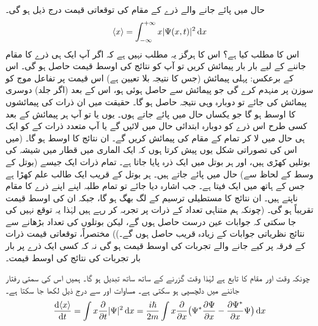  حال  میں پائے جانے والے ذرے کے مقام  کی توقعاتی قیمت درج ذیل ہو گی۔
\begin{align}\label{مساوات_تفاعل_موج_معیار_حرکت_توقعاتی_قیمت_تعریف}
\langle x\rangle=\int_{-\infty}^{+\infty}x|\Psi (x,t)|^{2}\dif{x}
\end{align}
اس کا مطلب کیا ہے؟ اس کا ہرگز یہ مطلب نہیں ہے کہ اگر آپ ایک ہی ذرے کا مقام جاننے کے لیے بار بار پیمائش کریں تو آپ کو نتائج کی اوسط قیمت  حاصل ہو گی۔ اس کے برعکس: پہلی پیمائش (جس کا نتیجہ بلا تعیین ہے) اس قیمت پر تفاعل موج کو سوزن پر منہدم کرے گی جو پیمائش سے حاصل ہوئی ہو، اس کے بعد (اگر جلد) دوسری پیمائش کی جائے تو دوبارہ وہی نتیجہ حاصل ہو گا۔ حقیقت میں 
 ان ذرات کی پیمائشوں کا اوسط ہو گا جو یکساں حال  میں پائے جاتے ہوں۔ یوں یا تو آپ ہر پیمائش کے بعد کسی طرح اس ذرے کو دوبارہ ابتدائی حال  میں لائیں گے یا آپ متعدد ذرات کے  کو ایک ہی حال  میں لا کر تمام کے مقام کی پیمائش کریں گے۔ ان نتائج کا اوسط  ہو گا۔ (میں اس کی تصوراتی شکل یوں پیش کرتا ہوں کہ ایک الماری میں قطار میں شیشہ کی بوتلیں کھڑی ہیں، اور ہر بوتل میں ایک ذرہ پایا جاتا ہے۔ تمام ذرات ایک جیسے (بوتل کے وسط کے لحاظ سے) حال  میں پائے جاتے ہیں۔ ہر بوتل کے قریب ایک طالب علم کھڑا ہے جس کے ہاتھ میں ایک فیتا ہے۔ جب اشارہ دیا جائے تو تمام طلبہ اپنے اپنے ذرے کا مقام ناپتے ہیں۔ ان نتائج کا مستطیلی ترسیم  کے لگ بھگ ہو گا، جبکہ ان کی اوسط قیمت تقریباً  ہو گی۔ (چونکہ ہم متناہی تعداد کے ذرات پر تجربہ کر رہے ہیں لہٰذا یہ توقع نہیں کی جا سکتی کہ جوابات عین درست حاصل ہوں گے، لیکن بوتلوں کی تعداد بڑھانے سے نتائج نظریاتی جوابات کے زیادہ قریب حاصل ہوں گے۔)) مختصراً، توقعاتی قیمت ذرات کے فرقہ پر کیے جانے والے تجربات کی اوسط قیمت ہو گی نہ کہ کسی ایک ذرے پر بار بار تجربات کی نتائج کی اوسط قیمت۔

 چونکہ  وقت اور مقام کا تابع ہے لہٰذا وقت گزرنے کے ساتھ ساتھ  تبدیل ہو گا۔ ہمیں اس کی سمتی رفتار جاننے میں دلچسپی ہو سکتی ہے۔ مساوات  اور  سے درج ذیل لکھا جا سکتا ہے۔
\begin{align}\label{مساوات_تفاعل_موج_رفتار_توقعاتی_الف}
\frac{\dif \,\langle x \rangle}{\dif{t}}=\int x\frac{\partial}{\partial{t}}|\Psi|^{2}\dif{x}=\frac{i\hslash}{2m}\int x\frac{\partial}{\partial{x}}\big (\Psi ^*\frac{\partial{\Psi}}{\partial{x}}-\frac{\partial{\Psi^ *}}{\partial{x}}\Psi \big)\dif{x}
\end{align}

